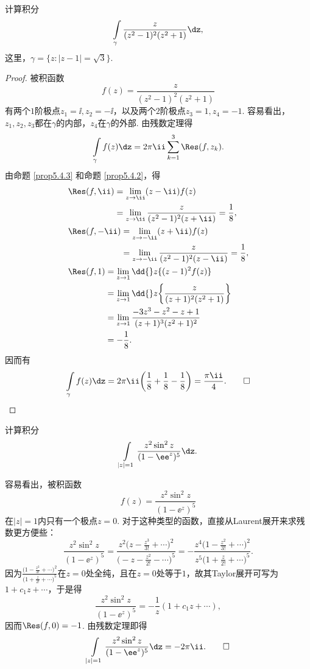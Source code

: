 \begin{example}\label{exam5.4.10}
计算积分
\[\int\limits_{\gamma}\frac{z}{(z^2-1)^2(z^2+1)}\dz,\]
这里，$\gamma=\{z:|z-1|=\sqrt3\}$.
\end{example}
\begin{proof}被积函数
\[f(z)=\frac{z}{(z^2-1)^2(z^2+1)}\]
有两个$1$阶极点$z_1=\ii,z_2=-\ii$，以及两个$2$阶极点$z_3=1,z_4=-1$. 容易看出，$z_1,z_2,z_3$都在$\gamma$的内部，$z_4$在$\gamma$的外部. 由残数定理得
\[\int\limits_\gamma f(z)\dz=2\pi\ii\sum_{k=1}^3\Res(f,z_k).\]
由命题 \ref{prop5.4.3} 和命题 \ref{prop5.4.2}，得
\begin{align*}
&\begin{aligned}
\Res(f,\ii)&=\lim_{z\to\ii}(z-\ii)f(z)\\
&=\lim_{z\to\ii}\frac{z}{(z^2-1)^2(z+\ii)}=\frac18,
\end{aligned}\\
&\begin{aligned}
\Res(f,-\ii)&=\lim_{z\to-\ii}(z+\ii)f(z)\\
&=\lim_{z\to-\ii}\frac{z}{(z^2-1)^2(z-\ii)}=\frac18,
\end{aligned}\\
&\begin{aligned}
\Res(f,1)&=\lim_{z\to1}\dd{}z\{(z-1)^2f(z)\}\\
&=\lim_{z\to1}\dd{}z\bigg\{\frac z{(z+1)^2(z^2+1)}\bigg\}\\
&=\lim_{z\to1}\frac{-3z^3-z^2-z+1}{(z+1)^3(z^2+1)^2}\\
&=-\frac18.
\end{aligned}
\end{align*}
因而有
\[
  \int\limits_\gamma f(z)\dz=2\pi\ii\bigg(\frac18+\frac18-\frac18\bigg)
  =\frac{\pi\ii}4. \qedhere
\]
\end{proof}

\begin{example}\label{exam5.4.11}
计算积分
\[\int\limits_{|z|=1}\frac{z^2\sin^2z}{(1-\ee^z)^5}\dz.\]
\end{example}
\begin{solution}
容易看出，被积函数
\[f(z)=\frac{z^2\sin^2z}{(1-\ee^z)^5}\]
在$|z|=1$内只有一个极点$z=0$. 对于这种类型的函数，直接从Laurent展开来求残数更方便些：
\[\frac{z^2\sin^2z}{(1-\ee^z)^5}
=\frac{z^2\big(z-\frac{z^3}{3!}+\cdots\big)^2}{\big(-z-\frac{z^2}{2!}-\cdots\big)^5}
=-\frac{z^4\big(1-\frac{z^2}{3!}+\cdots\big)^2}{z^5\big(1+\frac z{2!}+\cdots\big)^5}.\]
因为$\frac{\big(1-\frac{z^2}{3!}+\cdots\big)^2}{\big(1+\frac z{2!}+\cdots\big)^5}$在$z=0$处全纯，且在$z=0$处等于$1$，故其Taylor展开可写为$1+c_1z+\cdots$，于是得
\[\frac{z^2\sin^2z}{(1-\ee^z)^5}=-\frac1z(1+c_1z+\cdots),\]
因而$\Res(f,0)=-1$. 由残数定理即得
\begin{equation*}
  \int\limits_{|z|=1}\frac{z^2\sin^2z}{(1-\ee^z)^5}\dz = -2\pi\ii. \qedhere
\end{equation*}
\end{solution}

